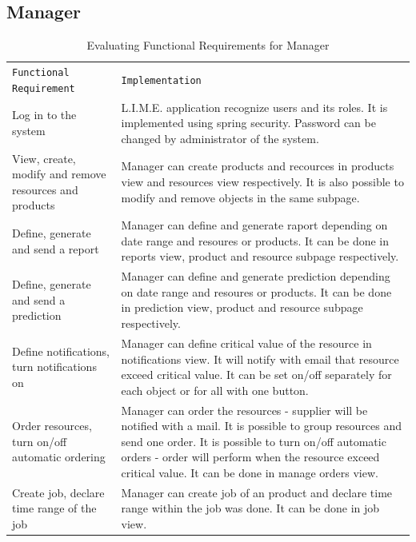 \documentclass[a4paper,11pt,twoside]{report}
\theoremstyle{definition}
\begin{document}
\begin{longtable}{|p{4cm}|p{12cm}|}
\end{longtable}

\subsection{Manager}

\begin{longtable}{|p{4cm}|p{12cm}|}
\caption[Evaluating Functional Requirements for Manager]{Evaluating Functional Requirements for Manager}
\label{Evaluating Functional Requirements for Manager}
\centering
\tabularnewline

\hline
\texttt{Functional Requirement} & \texttt{Implementation} \\ \hline

Log in to the system & L.I.M.E. application recognize users and its roles. It is implemented using spring security. Password can be changed by administrator of the system. \\ \hline
View, create, modify and remove resources and products & Manager can create products and recources in products view and  resources view respectively. It is also possible to modify and remove objects in the same subpage. \\ \hline
Define, generate and send a report & Manager can define and generate raport depending on date range and resoures or products. It can be done in reports view, product and resource subpage respectively. \\ \hline
Define, generate and send a prediction & Manager can define and generate prediction depending on date range and resoures or products. It can be done in prediction view, product and resource subpage respectively. \\ \hline
Define notifications, turn notifications on & Manager can define critical value of the resource in notifications view. It will notify with email that resource exceed critical value. It can be set on/off separately for each object or for all with one button. \\ \hline
Order resources, turn on/off automatic ordering & Manager can order the resources - supplier will be notified with a mail. It is possible to group resources and send one order. It is possible to turn on/off automatic orders - order will perform when the resource exceed critical value. It can be done in manage orders view. \\ \hline
Create job, declare time range of the job & Manager can create job of an product and declare time range within the job was done. It can be done in job view. \\ \hline



\end{longtable}
\end{document}
